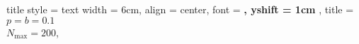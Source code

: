 	title style				= { text width = 6cm, align = center, font = \bf, yshift = 1cm },
	title					= {$p = b = 0.1$ \\ $N_{\max} = 200$},

